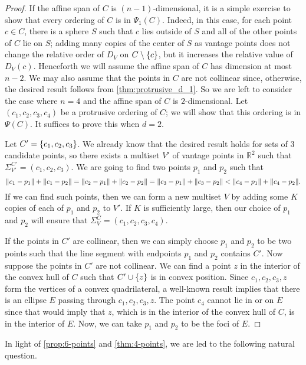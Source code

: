 \documentclass[11pt]{amsart}
\theoremstyle{definition}
\DeclarePairedDelimiter{\set}{\{}{\}}
\DeclarePairedDelimiter{\Abs}{\lVert}{\rVert}
\newcommand{\RR}{\mathbb{R}}
\begin{document}
\begin{proof}
If the affine span of $C$ is $(n-1)$-dimensional, it is a simple exercise to show that every ordering of $C$ is in $\Psi_1(C)$.  Indeed, in this case, for each point $c \in C$, there is a sphere $S$ such that $c$ lies outside of $S$ and all of the other points of $C$ lie on $S$; adding many copies of the center of $S$ as vantage points does not change the relative order of $D_V$ on $C \setminus \set{c}$, but it increases the relative value of $D_V(c)$.  Henceforth we will assume the affine span of $C$ has dimension at most $n-2$. We may also assume that the points in $C$ are not collinear since, otherwise, the desired result follows from \cref{thm:protrusive_d_1}. So we are left to consider the case where $n=4$ and the affine span of $C$ is $2$-dimensional. Let $(c_1,c_2,c_3,c_4)$ be a protrusive ordering of $C$; we will show that this ordering is in $\Psi(C)$. It suffices to prove this when $d=2$. 

Let $C'=\set{c_1,c_2,c_3}$. We already know that the desired result holds for sets of $3$ candidate points, so there exists a multiset $V'$ of vantage points in $\RR^2$ such that $\Sigma_{V'}^{C'}=(c_1,c_2,c_3)$. We are going to find two points $p_1$ and $p_2$ such that \[\Abs{c_1-p_1}+\Abs{c_1-p_2}=\Abs{c_2-p_1}+\Abs{c_2-p_2}=\Abs{c_3-p_1}+\Abs{c_3-p_2}<\Abs{c_4-p_1}+\Abs{c_4-p_2}.\] If we can find such points, then we can form a new multiset $V$ by adding some $K$ copies of each of $p_1$ and $p_2$ to $V'$. If $K$ is sufficiently large, then our choice of $p_1$ and $p_2$ will ensure that $\Sigma_V^C=(c_1,c_2,c_3,c_4)$. 

If the points in $C'$ are collinear, then we can simply choose $p_1$ and $p_2$ to be two points such that the line segment with endpoints $p_1$ and $p_2$ contains $C'$. Now suppose the points in $C'$ are not collinear. We can find a point $z$ in the interior of the convex hull of $C$ such that $C' \cup \set{z}$ is in convex position. Since $c_1,c_2,c_3,z$ form the vertices of a convex quadrilateral, a well-known result \cite{Munn} implies that there is an ellipse $E$ passing through $c_1,c_2,c_3,z$. The point $c_4$ cannot lie in or on $E$ since that would imply that $z$, which is in the interior of the convex hull of $C$, is in the interior of $E$. Now, we can take $p_1$ and $p_2$ to be the foci of $E$. 
\end{proof}

In light of \cref{prop:6-points} and \cref{thm:4-points}, we are led to the following natural question. 
\end{document}
